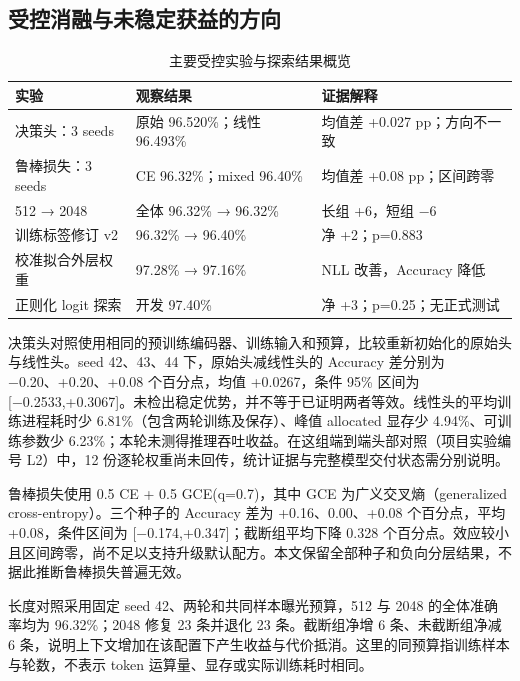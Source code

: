 \documentclass[UTF8,fontset=fandol,a4paper,11pt]{ctexart}
\begin{document}
\subsection{受控消融与未稳定获益的方向}
\begin{table}[htbp]\centering\caption{主要受控实验与探索结果概览}\label{tab:t5}\small\renewcommand{\arraystretch}{1.25}
\begin{tabularx}{\linewidth}{YYY}\toprule
\textbf{实验} & \textbf{观察结果} & \textbf{证据解释}\\\midrule
决策头：3 seeds & 原始 96.520\%；线性 96.493\% & 均值差 +0.027 pp；方向不一致\\
鲁棒损失：3 seeds & CE 96.32\%；mixed 96.40\% & 均值差 +0.08 pp；区间跨零\\
512 → 2048 & 全体 96.32\% → 96.32\% & 长组 +6，短组 −6\\
训练标签修订 v2 & 96.32\% → 96.40\% & 净 +2；p=0.883\\
校准拟合外层权重 & 97.28\% → 97.16\% & NLL 改善，Accuracy 降低\\
正则化 logit 探索 & 开发 97.40\% & 净 +3；p=0.25；无正式测试\\
\bottomrule\end{tabularx}\end{table}
决策头对照使用相同的预训练编码器、训练输入和预算，比较重新初始化的原始头与线性头。seed 42、43、44 下，原始头减线性头的 Accuracy 差分别为 −0.20、+0.20、+0.08 个百分点，均值 +0.0267，条件 95\% 区间为 [−0.2533,+0.3067]。未检出稳定优势，并不等于已证明两者等效。线性头的平均训练进程耗时少 6.81\%（包含两轮训练及保存）、峰值 allocated 显存少 4.94\%、可训练参数少 6.23\%；本轮未测得推理吞吐收益。在这组端到端头部对照（项目实验编号 L2）中，12 份逐轮权重尚未回传，统计证据与完整模型交付状态需分别说明。

鲁棒损失使用 0.5 CE + 0.5 GCE(q=0.7)，其中 GCE 为广义交叉熵（generalized cross-entropy）。三个种子的 Accuracy 差为 +0.16、0.00、+0.08 个百分点，平均 +0.08，条件区间为 [−0.174,+0.347]；截断组平均下降 0.328 个百分点。效应较小且区间跨零，尚不足以支持升级默认配方。本文保留全部种子和负向分层结果，不据此推断鲁棒损失普遍无效。

长度对照采用固定 seed 42、两轮和共同样本曝光预算，512 与 2048 的全体准确率均为 96.32\%；2048 修复 23 条并退化 23 条。截断组净增 6 条、未截断组净减 6 条，说明上下文增加在该配置下产生收益与代价抵消。这里的同预算指训练样本与轮数，不表示 token 运算量、显存或实际训练耗时相同。
\end{document}

